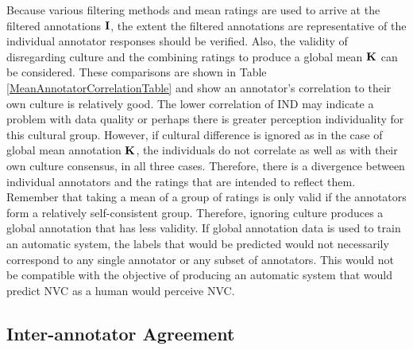 Because various filtering methods and mean ratings are used to arrive at the filtered annotations $\textbf{I}$, the extent the filtered annotations are representative of the individual annotator responses should be verified. Also, the validity of disregarding culture and the combining ratings to produce a global mean $\textbf{K}$ can be considered.
These comparisons are shown in Table \ref{MeanAnnotatorCorrelationTable} and show an annotator's correlation to their own culture is relatively good. The lower correlation of IND may indicate a problem with data quality or perhaps there is greater perception individuality for this cultural group.
However, if cultural difference is ignored as in the case of global mean annotation $\textbf{K}$, the individuals do not correlate as well as with their own culture consensus, in all three cases. Therefore, there is a divergence between individual annotators and the ratings that are intended to reflect them. Remember that taking a mean of a group of ratings is only valid if the annotators form a relatively self-consistent group. Therefore, ignoring culture produces a global annotation that has less validity. If global annotation data is used to train an automatic system, the labels that would be predicted would not necessarily correspond to any single annotator or any subset of annotators. This would not be compatible with the objective of producing an automatic system that would predict \ac{NVC} as a human would perceive \ac{NVC}.





\subsection{Inter-annotator Agreement}
\label{SectionInterAnnotatorAgreement}

